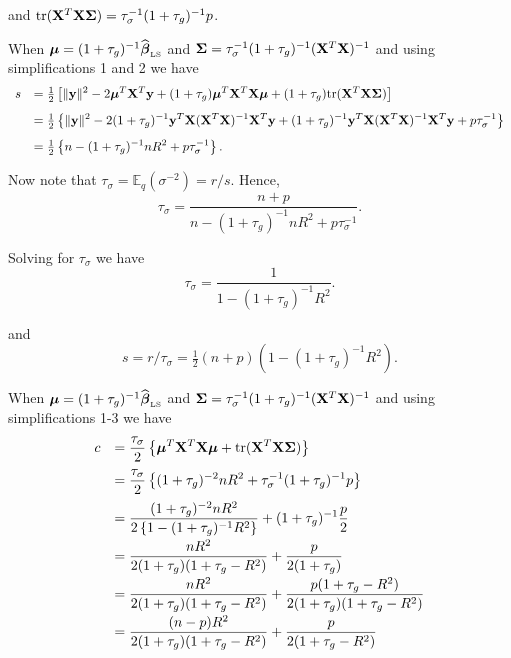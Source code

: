 \documentclass{article}
\def\vectorfontone{\bf}
\def\vectorfonttwo{\boldsymbol}
\def\vy{{\vectorfontone y}}                      %
\def\vbeta{{\vectorfonttwo \beta}}               %
\def\vmu{{\vectorfonttwo \mu}}                   %
\def\matrixfontone{\bf}
\def\matrixfonttwo{\boldsymbol}
\def\mX{{\matrixfontone X}}                      %
\def\mSigma{{\matrixfonttwo \Sigma}}             %
\def\bE{{\mathbb E}}                             %
\def\ds{\displaystyle}
\begin{document}
\noindent and
$\mbox{tr}(\mX^T\mX\mSigma) = \tau_\sigma^{-1}(1 + \tau_g)^{-1}p$.

\medskip 
{} When $\vmu = (1 + \tau_g)^{-1}\widehat{\vbeta}_{\mbox{\tiny LS}}$
and $\mSigma = \tau_\sigma^{-1}(1 + \tau_g)^{-1}(\mX^T\mX)^{-1}$
and using simplifications 1 and 2 we have
$$
\begin{array}{rl}
s 
& \ds 
= \tfrac{1}{2}\left[ \|\vy\|^2 
- 2\vmu^T\mX^T\vy 
+ (1 + \tau_g)\vmu^T\mX^T\mX\vmu  
+ (1 + \tau_g)\mbox{tr}(\mX^T\mX\mSigma)
\right]
\\ [2ex]
& \ds = \tfrac{1}{2}\left\{ \|\vy\|^2 
- 2(1 + \tau_g)^{-1} \vy^T\mX(\mX^T\mX)^{-1}\mX^T\vy 
+ (1 + \tau_g)^{-1}\vy^T\mX(\mX^T\mX)^{-1}\mX^T\vy 
+ p\tau_\sigma^{-1} \right\}
\\ [2ex]
& \ds = \tfrac{1}{2}\left\{ n
- (1 + \tau_g)^{-1} nR^2
+ p\tau_\sigma^{-1}\right\}.
\end{array}
$$

\noindent Now note that $\tau_\sigma = \bE_q(\sigma^{-2}) = r/s$. Hence,
$$
\tau_\sigma = \frac{n+p}{ n 
	- (1 + \tau_g)^{-1} nR^2
	+ p\tau_\sigma^{-1} }.
$$

\noindent Solving for $\tau_\sigma$ we have
$$
\tau_\sigma 
= \frac{1}{1 - (1 + \tau_g)^{-1} R^2}.
$$

\noindent and
$$
s =  r/\tau_\sigma = \tfrac{1}{2}(n + p )( 1 - (1 + \tau_g)^{-1} R^2).
$$


\medskip 
{} When $\vmu = (1 + \tau_g)^{-1}\widehat{\vbeta}_{\mbox{\tiny LS}}$
and $\mSigma = \tau_\sigma^{-1}(1 + \tau_g)^{-1}(\mX^T\mX)^{-1}$
and using simplifications 1-3 we have
$$
\begin{array}{rl}
\ds c 
& \ds = \frac{\tau_\sigma}{2}\left\{ \vmu^T\mX^T\mX\vmu + \mbox{tr}(\mX^T\mX\mSigma)\right\}
\\ [2ex]
& \ds = \frac{\tau_\sigma}{2}\left\{ (1 + \tau_g)^{-2} n R^2 + \tau_\sigma^{-1}(1 + \tau_g)^{-1}p \right\}
\\ [2ex]
& \ds = \frac{(1 + \tau_g)^{-2}nR^2}{2\left\{ 1
	- (1 + \tau_g)^{-1} R^2\right\} } + (1 + \tau_g)^{-1}\frac{p}{2} 
\\ [2ex]
& \ds = \frac{nR^2}{2( 1 + \tau_g)( 1 + \tau_g
	-   R^2)} + \frac{p}{2(1 + \tau_g)} 
\\ [2ex]
& \ds = \frac{nR^2}{2( 1 + \tau_g)( 1 + \tau_g
	-   R^2)} + \frac{p( 1 + \tau_g
	-   R^2)}{2(1 + \tau_g)( 1 + \tau_g
	-   R^2)}
\\ [2ex]
& \ds = \frac{(n-p)R^2}{2( 1 + \tau_g)( 1 + \tau_g
	-   R^2)} + \frac{p}{2( 1 + \tau_g
	-   R^2)} 
\end{array}
$$
\end{document}
